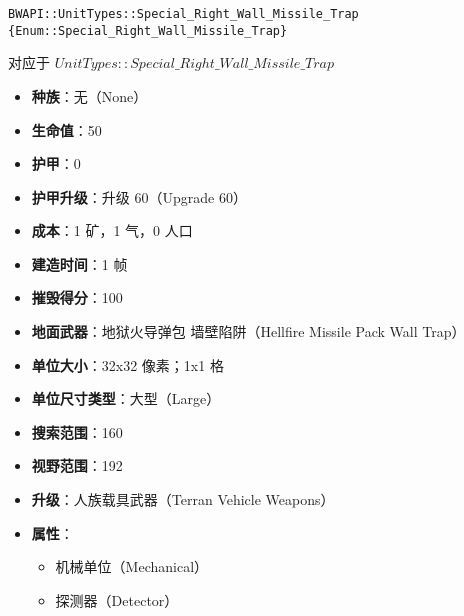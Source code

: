 \begin{tcolorbox}[colback=white, colframe=black!60!white, title=Special\_Right\_Wall\_Missile\_Trap(), arc=0mm]
    \begin{verbatim}
BWAPI::UnitTypes::Special_Right_Wall_Missile_Trap {Enum::Special_Right_Wall_Missile_Trap}
    \end{verbatim}
    对应于  $UnitTypes::Special\_Right\_Wall\_Missile\_Trap$ 
    \begin{itemize}
        \item \textbf{种族}：无（None）
        \item \textbf{生命值}：50
        \item \textbf{护甲}：0
        \item \textbf{护甲升级}：升级 60（Upgrade 60）
        \item \textbf{成本}：1 矿，1 气，0 人口
        \item \textbf{建造时间}：1 帧
        \item \textbf{摧毁得分}：100
        \item \textbf{地面武器}：地狱火导弹包 墙壁陷阱（Hellfire Missile Pack Wall Trap）
        \item \textbf{单位大小}：32x32 像素；1x1 格
        \item \textbf{单位尺寸类型}：大型（Large）
        \item \textbf{搜索范围}：160
        \item \textbf{视野范围}：192
        \item \textbf{升级}：人族载具武器（Terran Vehicle Weapons）
        \item \textbf{属性}：
            \begin{itemize}
                \item 机械单位（Mechanical）
                \item 探测器（Detector）
            \end{itemize}
    \end{itemize}
\end{tcolorbox}

